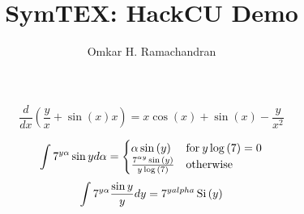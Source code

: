 \documentclass[english]{article}
\begin{document}
\title{SymTEX: HackCU Demo}

\author{Omkar H. Ramachandran}
\maketitle


$$
\frac{d}{dx}{(\frac{y}{x}+\sin(x)x)}=x \cos{\left (x \right )} + \sin{\left (x \right )} - \frac{y}{x^{2}}
$$

$$
\intop{7^{y\alpha} \sin{y} d\alpha}=\begin{cases} \alpha \sin{\left (y \right )} & \text{for}\: y \log{\left (7 \right )} = 0 \\\frac{7^{\alpha y} \sin{\left (y \right )}}{y \log{\left (7 \right )}} & \text{otherwise} \end{cases}
$$
$$
\intop{7^{y\alpha} \frac{\sin{y}}{y} dy}=7^{yalpha} \operatorname{Si}{\left (y \right )}
$$
\end{document}
